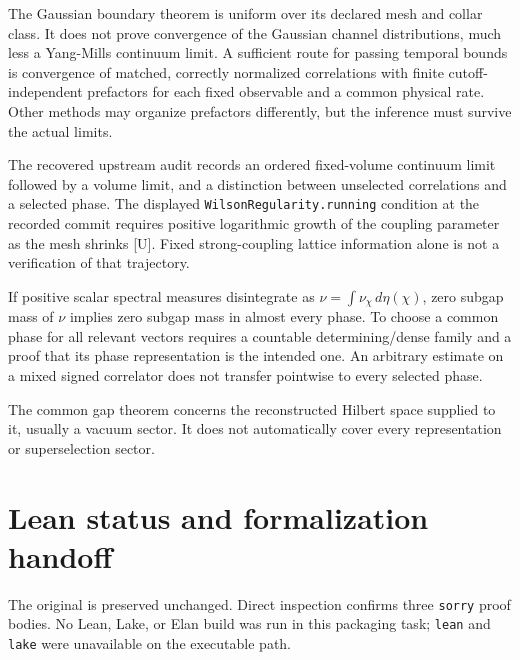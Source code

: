 \documentclass[
  11pt,
  letterpaper,
]{article}
\begin{document}
The Gaussian boundary theorem is uniform over its declared mesh and
collar class. It does not prove convergence of the Gaussian channel
distributions, much less a Yang-Mills continuum limit. A sufficient
route for passing temporal bounds is convergence of matched, correctly
normalized correlations with finite cutoff-independent prefactors for
each fixed observable and a common physical rate. Other methods may
organize prefactors differently, but the inference must survive the
actual limits.

The recovered upstream audit records an ordered fixed-volume continuum
limit followed by a volume limit, and a distinction between unselected
correlations and a selected phase. The displayed
\texttt{WilsonRegularity.running} condition at the recorded commit
requires positive logarithmic growth of the coupling parameter as the
mesh shrinks {[}U{]}. Fixed strong-coupling lattice information alone is
not a verification of that trajectory.

If positive scalar spectral measures disintegrate as
\(\nu=\int\nu_\chi\,d\eta(\chi)\), zero subgap mass of \(\nu\) implies
zero subgap mass in almost every phase. To choose a common phase for all
relevant vectors requires a countable determining/dense family and a
proof that its phase representation is the intended one. An arbitrary
estimate on a mixed signed correlator does not transfer pointwise to
every selected phase.

The common gap theorem concerns the reconstructed Hilbert space supplied
to it, usually a vacuum sector. It does not automatically cover every
representation or superselection sector.

\section{Lean status and formalization
handoff}\label{lean-status-and-formalization-handoff}

The original  is preserved
unchanged. Direct inspection confirms three \texttt{sorry} proof bodies.
No Lean, Lake, or Elan build was run in this packaging task;
\texttt{lean} and \texttt{lake} were unavailable on the executable path.
\end{document}
